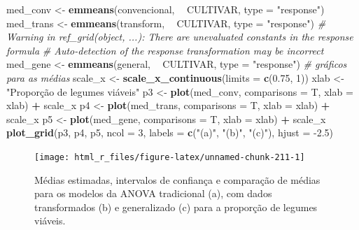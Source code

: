 \documentclass[
]{book}
\newenvironment{Shaded}{\begin{snugshade}}{\end{snugshade}}
\newcommand{\CommentTok}[1]{\textcolor[rgb]{0.56,0.35,0.01}{\textit{#1}}}
\newcommand{\DataTypeTok}[1]{\textcolor[rgb]{0.13,0.29,0.53}{#1}}
\newcommand{\DecValTok}[1]{\textcolor[rgb]{0.00,0.00,0.81}{#1}}
\newcommand{\FloatTok}[1]{\textcolor[rgb]{0.00,0.00,0.81}{#1}}
\newcommand{\KeywordTok}[1]{\textcolor[rgb]{0.13,0.29,0.53}{\textbf{#1}}}
\newcommand{\NormalTok}[1]{#1}
\newcommand{\OperatorTok}[1]{\textcolor[rgb]{0.81,0.36,0.00}{\textbf{#1}}}
\newcommand{\StringTok}[1]{\textcolor[rgb]{0.31,0.60,0.02}{#1}}
\begin{document}
\begin{Shaded}
\begin{Highlighting}[]
\NormalTok{med_conv <-}\StringTok{ }\KeywordTok{emmeans}\NormalTok{(convencional, }\OperatorTok{~}\StringTok{ }\NormalTok{CULTIVAR,  }\DataTypeTok{type =} \StringTok{"response"}\NormalTok{)}
\NormalTok{med_trans <-}\StringTok{ }\KeywordTok{emmeans}\NormalTok{(transform, }\OperatorTok{~}\StringTok{ }\NormalTok{CULTIVAR, }\DataTypeTok{type =} \StringTok{"response"}\NormalTok{)}
\CommentTok{# Warning in ref_grid(object, ...): There are unevaluated constants in the response formula}
\CommentTok{# Auto-detection of the response transformation may be incorrect}
\NormalTok{med_gene <-}\StringTok{ }\KeywordTok{emmeans}\NormalTok{(general, }\OperatorTok{~}\StringTok{ }\NormalTok{CULTIVAR, }\DataTypeTok{type =} \StringTok{"response"}\NormalTok{)}
\CommentTok{# gráficos para as médias}
\NormalTok{scale_x <-}\StringTok{ }\KeywordTok{scale_x_continuous}\NormalTok{(}\DataTypeTok{limits =} \KeywordTok{c}\NormalTok{(}\FloatTok{0.75}\NormalTok{, }\DecValTok{1}\NormalTok{))}
\NormalTok{xlab <-}\StringTok{ "Proporção de legumes viáveis"}
\NormalTok{p3 <-}\StringTok{ }\KeywordTok{plot}\NormalTok{(med_conv, }\DataTypeTok{comparisons =}\NormalTok{ T, }\DataTypeTok{xlab =}\NormalTok{ xlab) }\OperatorTok{+}\StringTok{ }\NormalTok{scale_x}
\NormalTok{p4 <-}\StringTok{ }\KeywordTok{plot}\NormalTok{(med_trans, }\DataTypeTok{comparisons =}\NormalTok{ T, }\DataTypeTok{xlab =}\NormalTok{ xlab) }\OperatorTok{+}\StringTok{ }\NormalTok{scale_x}
\NormalTok{p5 <-}\StringTok{ }\KeywordTok{plot}\NormalTok{(med_gene, }\DataTypeTok{comparisons =}\NormalTok{ T, }\DataTypeTok{xlab =}\NormalTok{ xlab) }\OperatorTok{+}\StringTok{ }\NormalTok{scale_x}
\KeywordTok{plot_grid}\NormalTok{(p3, p4, p5, }\DataTypeTok{ncol =} \DecValTok{3}\NormalTok{, }
          \DataTypeTok{labels =} \KeywordTok{c}\NormalTok{(}\StringTok{"(a)"}\NormalTok{, }\StringTok{"(b)"}\NormalTok{, }\StringTok{"(c)"}\NormalTok{), }\DataTypeTok{hjust =} \FloatTok{-2.5}\NormalTok{)}
\end{Highlighting}
\end{Shaded}

\begin{figure}

{\centering \texttt{[image: html\_r\_files/figure-latex/unnamed-chunk-211-1]} 

}

\caption{Médias estimadas, intervalos de confiança e comparação de médias para os modelos da ANOVA tradicional (a), com dados transformados (b) e generalizado (c) para a proporção de legumes viáveis.}\label{fig:unnamed-chunk-211}
\end{figure}
\end{document}
